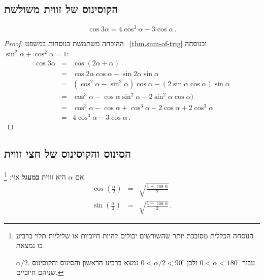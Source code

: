 
\subsection{הקוסינוס של זווית משולשת}\label{s.cosine}
\begin{theorem}\label{thm.triple-angle}
\[
\cos 3\alpha=4\cos^3\alpha -3\cos\alpha\,.
\]
\end{theorem}
\begin{proof}
ההוכחה משתמשת בנוסחות במשפט
~\ref{thm.sum-of-trig}
ובנוסחה
$\sin^2\alpha+\cos^2\alpha=1$:
\begin{eqnarray*}
\cos 3\alpha &=& \cos (2\alpha +\alpha)\\
&=& \cos 2\alpha\cos\alpha - \sin 2\alpha\sin\alpha\\
&=& (\cos^2\alpha -\sin^2\alpha)\cos\alpha - (2\sin\alpha\cos\alpha)\sin\alpha\\
&=&\cos^3\alpha - \cos\alpha\sin^2\alpha -2\sin^2\alpha\cos\alpha)\\
&=&\cos^3\alpha - \cos\alpha +\cos^3\alpha -2\cos\alpha+2\cos^3\alpha\\
&=&4\cos^3\alpha -3\cos\alpha\,.
\end{eqnarray*}
\end{proof}


\subsection{הסינוס והקוסינוס של חצי זווית}\label{s.sine-cosine-half}
\begin{theorem}\label{thm.sine-cosine-half}
אם 
$\alpha$
היא זווית 
\textbf{במעגל}
אזי:%
\footnote{
הנוסחה הכללית מסובכת יותר שהשורשים יכולים להיות חיוביות או שליליות תלוי ברביע בו נמצאת 

$\alpha/2$.
עבור 
$0\!<\!\alpha\!<\!180^\circ$
ולכן
$0\!<\!\alpha/2\!<\!90^\circ$
נמצא ברביע הראשון והסינוס והקוסינוס שניהם חיוביים.}
\begin{eqnarray*}
\cos \left(\frac{\alpha}{2}\right)&=&\sqrt{\frac{1+\cos\alpha}{2}}\\
\sin\left(\frac{\alpha}{2}\right)&=&\sqrt{\frac{1-\cos\alpha}{2}}\,.
\end{eqnarray*}
\end{theorem}

